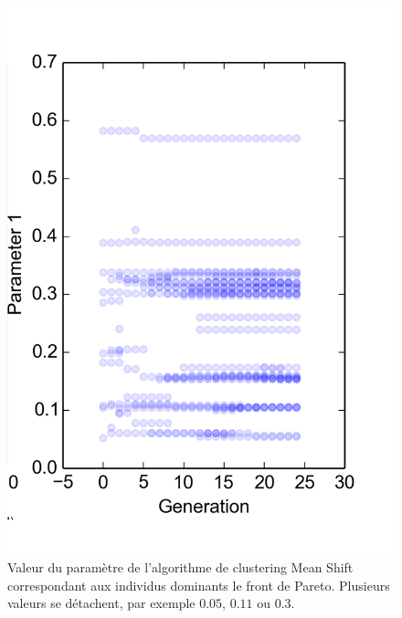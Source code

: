 \documentclass{llncs}
\begin{document}
\begin{figure}[!tbp]
  \centering
  \begin{minipage}[b]{0.4\textwidth}
    \includegraphics[width=\textwidth]{figures/Pareto_front.pdf}
    \caption{Valeur du paramètre de l'algorithme de clustering Mean Shift correspondant aux individus dominants le front de Pareto. Plusieurs valeurs se détachent, par exemple $0.05$, $0.11$ ou $0.3$.}
    \label{fig:pareto_front}
  \end{minipage}
  \hfill
  \begin{minipage}[b]{0.5\textwidth}

\end{minipage}
\end{figure}
\end{document}

